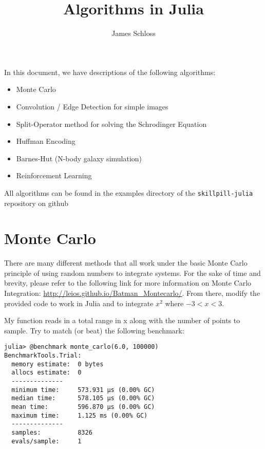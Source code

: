 \documentclass[11pt]{article}
\title{\textbf{Algorithms in Julia}}
\author{James Schloss}
\date{}
\begin{document}
\maketitle
In this document, we have descriptions of the following algorithms:
\begin{itemize}
\item Monte Carlo
\item Convolution / Edge Detection for simple images
\item Split-Operator method for solving the Schrodinger Equation
\item Huffman Encoding
\item Barnes-Hut (N-body galaxy simulation)
\item Reinforcement Learning
\end{itemize}

All algorithms can be found in the examples directory of the \texttt{skillpill-julia} repository on github

\newpage
\section*{Monte Carlo}

There are many different methods that all work under the basic Monte Carlo principle of using random numbers to integrate systems.
For the sake of time and brevity, please refer to the following link for more information on Monte Carlo Integration: \url{http://leios.github.io/Batman_Montecarlo/}. From there, modify the provided code to work in Julia and to integrate $x^2$ where $-3 < x < 3$.

My function reads in a total range in x along with the number of points to sample. Try to match (or beat) the following benchmark:

\begin{lstlisting}
julia> @benchmark monte_carlo(6.0, 100000)
BenchmarkTools.Trial: 
  memory estimate:  0 bytes
  allocs estimate:  0
  --------------
  minimum time:     573.931 μs (0.00% GC)
  median time:      578.105 μs (0.00% GC)
  mean time:        596.870 μs (0.00% GC)
  maximum time:     1.125 ms (0.00% GC)
  --------------
  samples:          8326
  evals/sample:     1

\end{lstlisting}

\newpage
\end{document}
